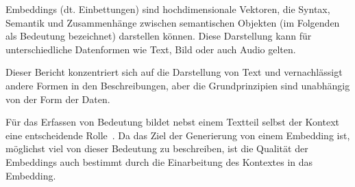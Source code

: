 \documentclass[../main.tex]{subfiles}
\begin{document}
Embeddings (dt. Einbettungen) sind hochdimensionale Vektoren, die Syntax, Semantik und Zusammenhänge zwischen semantischen Objekten (im Folgenden als Bedeutung bezeichnet) darstellen können.
Diese Darstellung kann für unterschiedliche Datenformen wie Text, Bild oder auch Audio gelten.
~\cite{mikolov2013efficient}

Dieser Bericht konzentriert sich auf die Darstellung von Text und vernachlässigt andere Formen in den Beschreibungen, aber die Grundprinzipien sind unabhängig von der Form der Daten.

Für das Erfassen von Bedeutung bildet nebst einem Textteil selbst der Kontext eine entscheidende Rolle~\cite{rubenstein1965contextual}.
Da das Ziel der Generierung von einem Embedding ist, möglichst viel von dieser Bedeutung zu beschreiben, ist die Qualität der Embeddings auch bestimmt durch die Einarbeitung des Kontextes in das Embedding.
~\cite{huang-etal-2012-improving}
\end{document}
